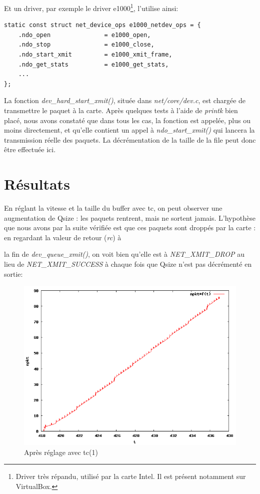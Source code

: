 \documentclass[a4paper]{article}
\begin{document}
Et un driver, par exemple le driver e1000\footnote{Driver très répandu,
utilisé par la carte Intel. Il est présent notamment sur VirtualBox.},
l'utilise ainsi:
\begin{verbatim}
static const struct net_device_ops e1000_netdev_ops = {
    .ndo_open               = e1000_open,
    .ndo_stop               = e1000_close,
    .ndo_start_xmit         = e1000_xmit_frame,
    .ndo_get_stats          = e1000_get_stats,
    ...
};
\end{verbatim}

La fonction \textit{dev\_hard\_start\_xmit()}, située dans
\textit{net/core/dev.c}, est chargée de transmettre le paquet
à la carte. Après quelques tests à l'aide de \textit{printk} bien
placé, nous avons constaté que dans tous les cas, la fonction
est appelée, plus ou moins directement, et qu'elle contient 
un appel à \textit{ndo\_start\_xmit()} qui lancera la transmission réelle des paquets. La décrémentation de la
taille de la file peut donc être effectuée ici.

\section{Résultats}
En réglant la vitesse et la taille du buffer avec tc, on peut observer
une augmentation de Qsize : les paquets rentrent, mais ne sortent jamais.
L'hypothèse que nous avons par la suite vérifiée est que ces paquets
sont droppés par la carte : en regardant la valeur de retour (\textit{rc}) à

la  fin de \textit{dev\_queue\_xmit()}, on voit bien  qu'elle est à
\textit{NET\_XMIT\_DROP} au lieu de \textit{NET\_XMIT\_SUCCESS} à chaque
fois que Qsize n'est pas décrémenté
en sortie:
\begin{figure}[!ht]
	\centering
	\includegraphics[scale=.5]{npkt_f_t_dropped.png}
	\caption{\label{dropped} Après réglage avec tc(1)}
\end{figure}
\end{document}
